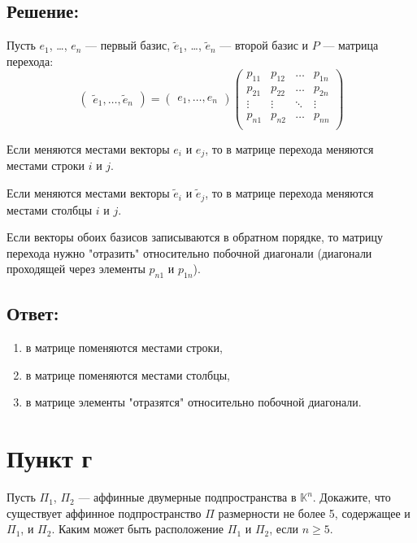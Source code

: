 \documentclass[12pt]{article}
\begin{document}
    \subsection*{Решение:}
    Пусть $e_1$, \dots, $e_n$ --- первый базис, $\widetilde{e}_1$, \dots, $\widetilde{e}_n$ --- второй базис и $P$ --- матрица перехода:
    \[
        \begin{pmatrix}
            \widetilde{e}_1, \dots, \widetilde{e}_n
        \end{pmatrix}
        =
        \begin{pmatrix}
            e_1, \dots, e_n
        \end{pmatrix}
        \begin{pmatrix}
            p_{11} & p_{12} & \dots  & p_{1n} \\
            p_{21} & p_{22} & \dots  & p_{2n} \\
            \vdots & \vdots & \ddots & \vdots \\
            p_{n1} & p_{n2} & \dots  & p_{nn} \\
        \end{pmatrix}
    \]

    Если меняются местами векторы $e_i$ и $e_j$, то в матрице перехода меняются местами строки $i$ и $j$.

    Если меняются местами векторы $\widetilde{e}_i$ и $\widetilde{e}_j$, то в матрице перехода меняются местами столбцы $i$ и $j$.

    Если векторы обоих базисов записываются в обратном порядке, то матрицу перехода нужно "отразить" относительно побочной диагонали (диагонали проходящей через элементы $p_{n1}$ и $p_{1n}$).

    \subsection*{Ответ:}
    \begin{enumerate}
        \item в матрице поменяются местами строки,
        \item в матрице поменяются местами столбцы,
        \item в матрице элементы "отразятся"{} относительно побочной диагонали.
    \end{enumerate}

    \section*{Пункт г}
    Пусть $\Pi_1$, $\Pi_2$ --- аффинные двумерные подпространства в $\mathbb{K}^n$. Докажите, что существует аффинное подпространство $\Pi$ размерности не более 5, содержащее и $\Pi_1$,
    и $\Pi_2$. Каким может быть расположение $\Pi_1$ и $\Pi_2$, если $n \ge 5$.
\end{document}
